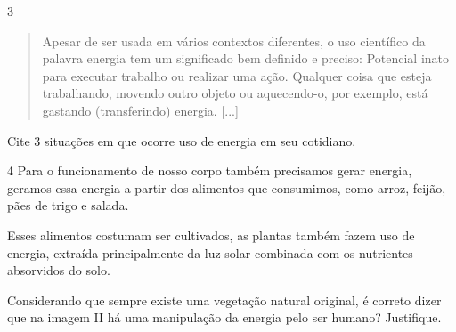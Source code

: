 
\num{3}

\begin{quote}
Apesar de ser usada em vários contextos diferentes, o uso
científico da palavra energia tem um significado bem definido e preciso:
Potencial inato para executar trabalho ou realizar uma ação. Qualquer
coisa que esteja trabalhando, movendo outro objeto ou aquecendo-o, por
exemplo, está gastando (transferindo) energia. {[}...{]}

\end{quote}

Cite 3 situações em que ocorre uso de energia em seu cotidiano.

\linhas[2]


\num{4} Para o funcionamento de nosso corpo também precisamos gerar energia,
geramos essa energia a partir dos alimentos que consumimos, como arroz,
feijão, pães de trigo e salada.

Esses alimentos costumam ser cultivados, as plantas também fazem uso de
energia, extraída principalmente da luz solar combinada com os
nutrientes absorvidos do solo.

%
%
%
%
%

Considerando que sempre existe uma vegetação natural original, é correto
dizer que na imagem II há uma manipulação da energia pelo ser humano?
Justifique.

\linhas[3]



